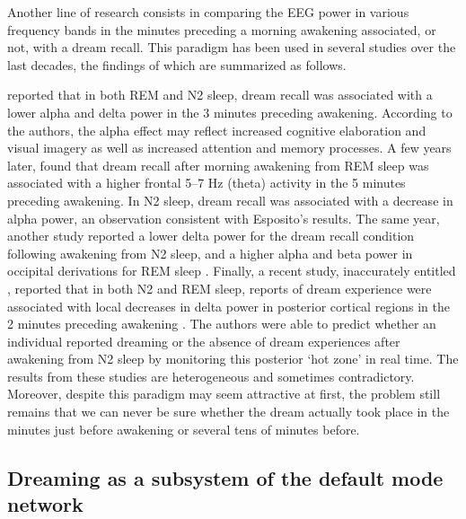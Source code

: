 Another line of research consists in comparing the EEG power in various frequency bands in the minutes preceding a morning awakening associated, or not, with a dream recall. This paradigm has been used in several studies over the last decades, the findings of which are summarized as follows.

\citet{esposito_reduced_2004} reported that in both REM and N2 sleep, dream recall was associated with a lower alpha and delta power in the 3 minutes preceding awakening. According to the authors, the alpha effect may reflect increased cognitive elaboration and visual imagery as well as increased attention and memory processes. A few years later, \citet{marzano_recalling_2011} found that dream recall after morning awakening from REM sleep was associated with a higher frontal 5–7 Hz (theta) activity in the 5 minutes preceding awakening. In N2 sleep, dream recall was associated with a decrease in alpha power, an observation consistent with Esposito’s results. The same year, another study reported a lower delta power for the dream recall condition following awakening from N2 sleep, and a higher alpha and beta power in occipital derivations for REM sleep \citep{chellappa_cortical_2011}. Finally, a recent study, inaccurately entitled , reported that in both N2 and REM sleep, reports of dream experience were associated with local decreases in delta power in posterior cortical regions in the 2 minutes preceding awakening \citep{siclari_neural_2017}. The authors were able to predict whether an individual reported dreaming or the absence of dream experiences after awakening from N2 sleep by monitoring this posterior ‘hot zone’ in real time.
The results from these studies are heterogeneous and sometimes contradictory. Moreover, despite this paradigm may seem attractive at first, the problem still remains that we can never be sure whether the dream actually took place in the minutes just before awakening or several tens of minutes before.

\subsection{Dreaming as a subsystem of the default mode network}
\label{sec:dream-research:attempts:dmn}

